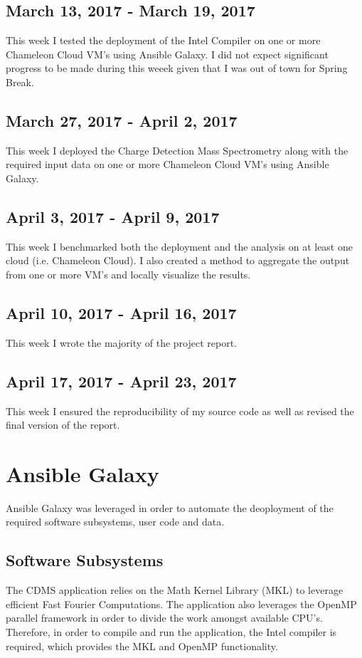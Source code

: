 \documentclass[9pt,twocolumn,twoside]{../../styles/osajnl}
\begin{document}
\subsection{March 13, 2017 - March 19, 2017}
This week I tested the deployment of the Intel Compiler on one or more
Chameleon Cloud VM's using Ansible Galaxy. I did not expect
significant progress to be made during this weeek given that I was out
of town for Spring Break.
\subsection{March 27, 2017 - April 2, 2017}
This week I deployed the Charge Detection Mass Spectrometry along with
the required input data on one or more Chameleon Cloud VM's using
Ansible Galaxy.
\subsection{April 3, 2017 - April 9, 2017}
This week I benchmarked both the deployment and the analysis on at
least one cloud (i.e. Chameleon Cloud). I also created a method to
aggregate the output from one or more VM's and locally visualize the
results.
\subsection{April 10, 2017 - April 16, 2017}
This week I wrote the majority of the project report. 
\subsection{April 17, 2017 - April 23, 2017}
This week I ensured the reproducibility of my source code as well as
revised the final version of the report.

\section{Ansible Galaxy} \label{licensing}
Ansible Galaxy was leveraged in order to automate the deoployment of
the required software subsystems, user code and data.

\subsection{Software Subsystems} \label{software}
The CDMS application relies on the Math Kernel Library (MKL) to
leverage efficient Fast Fourier Computations. The application also
leverages the OpenMP parallel framework in order to divide the work
amongst available CPU's. Therefore, in order to compile and run the
application, the Intel compiler is required, which provides the MKL
and OpenMP functionality.
\end{document}
